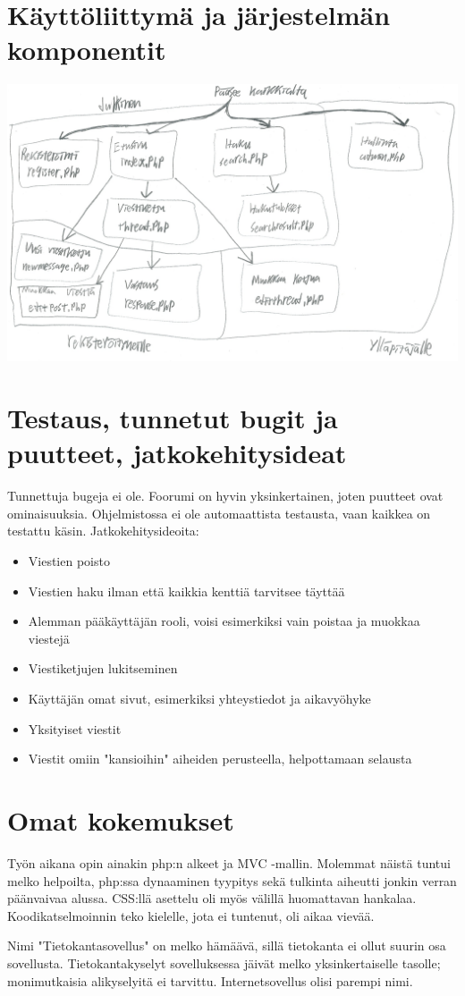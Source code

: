 \documentclass[a4paper, 12pt, finnish]{article}
\begin{document}
\newpage

\section{Käyttöliittymä ja järjestelmän komponentit}
\includegraphics[width=\textwidth,height=\textheight,keepaspectratio]{kayttoliittyma.png}

\newpage

\section{Testaus, tunnetut bugit ja puutteet, jatkokehitysideat}
Tunnettuja bugeja ei ole.
Foorumi on hyvin yksinkertainen, joten puutteet ovat ominaisuuksia.
Ohjelmistossa ei ole automaattista testausta, vaan kaikkea on testattu käsin.
Jatkokehitysideoita:
\begin{itemize}
\item
Viestien poisto
\item
Viestien haku ilman että kaikkia kenttiä tarvitsee täyttää
\item
Alemman pääkäyttäjän rooli, voisi esimerkiksi vain poistaa ja muokkaa viestejä
\item
Viestiketjujen lukitseminen
\item
Käyttäjän omat sivut, esimerkiksi yhteystiedot ja aikavyöhyke
\item
Yksityiset viestit
\item
Viestit omiin "kansioihin" aiheiden perusteella, helpottamaan selausta
\end{itemize}

\newpage

\section{Omat kokemukset}
Työn aikana opin ainakin php:n alkeet ja MVC -mallin.
Molemmat näistä tuntui melko helpoilta, php:ssa dynaaminen tyypitys sekä tulkinta aiheutti jonkin verran päänvaivaa alussa.
CSS:llä asettelu oli myös välillä huomattavan hankalaa.
Koodikatselmoinnin teko kielelle, jota ei tuntenut, oli aikaa vievää.
\indent

Nimi "Tietokantasovellus" on melko hämäävä, sillä tietokanta ei ollut suurin osa sovellusta.
Tietokantakyselyt sovelluksessa jäivät melko yksinkertaiselle tasolle; monimutkaisia alikyselyitä ei tarvittu.
Internetsovellus olisi parempi nimi.
\end{document}
